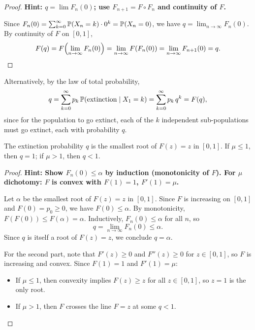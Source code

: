 \documentclass[a4paper]{article}
\begin{document}
\begin{proof}
  \textbf{Hint: $q = \lim F_n(0)$; use $F_{n+1} = F \circ F_n$ and continuity of $F$.}

  Since $F_n(0) = \sum_{k=0}^\infty \P(X_n = k) \cdot 0^k = \P(X_n = 0)$, we have $q = \lim_{n \to \infty} F_n(0)$.
  By continuity of $F$ on $[0,1]$,
  \[
    F(q) = F\!\left(\lim_{n \to \infty} F_n(0)\right) = \lim_{n \to \infty} F(F_n(0)) = \lim_{n \to \infty} F_{n+1}(0) = q. \qedhere
  \]
\end{proof}

\begin{remark}
  Alternatively, by the law of total probability,
  \[
    q = \sum_{k=0}^\infty p_k\,\P(\text{extinction} \mid X_1 = k) = \sum_{k=0}^\infty p_k\,q^k = F(q),
  \]
  since for the population to go extinct, each of the $k$ independent sub-populations must go extinct, each with probability $q$.
\end{remark}

\begin{thm}
  The extinction probability $q$ is the smallest root of $F(z) = z$ in $[0,1]$.
  If $\mu \leq 1$, then $q = 1$; if $\mu > 1$, then $q < 1$.
\end{thm}

\begin{proof}
  \textbf{Hint: Show $F_n(0) \leq \alpha$ by induction (monotonicity of $F$). For $\mu$ dichotomy: $F$ is convex with $F(1) = 1$, $F'(1) = \mu$.}

  Let $\alpha$ be the smallest root of $F(z) = z$ in $[0,1]$.
  Since $F$ is increasing on $[0,1]$ and $F(0) = p_0 \geq 0$, we have $F(0) \leq \alpha$.
  By monotonicity, $F(F(0)) \leq F(\alpha) = \alpha$.
  Inductively, $F_n(0) \leq \alpha$ for all $n$, so
  \[
    q = \lim_{n \to \infty} F_n(0) \leq \alpha.
  \]
  Since $q$ is itself a root of $F(z) = z$, we conclude $q = \alpha$.

  For the second part, note that $F'(z) \geq 0$ and $F''(z) \geq 0$ for $z \in [0,1]$, so $F$ is increasing and convex.
  Since $F(1) = 1$ and $F'(1) = \mu$:
  \begin{itemize}
    \item If $\mu \leq 1$, then convexity implies $F(z) \geq z$ for all $z \in [0,1]$, so $z = 1$ is the only root.
    \item If $\mu > 1$, then $F$ crosses the line $F = z$ at some $q < 1$.
  \end{itemize}
  \begin{center}
  \end{center}
\end{proof}
\end{document}
